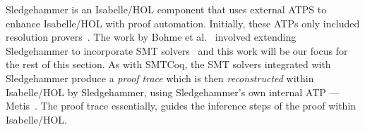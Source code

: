 \documentclass{article}
\begin{document}
	Sledgehammer is
	an Isabelle/HOL component that 
	uses external ATPS to enhance 
	Isabelle/HOL with proof 
	automation. Initially, these 
	ATPs only included resolution 
	provers~\cite{10.1007/978-3-642-39799-8_1}.
	The work by Bohme et 
	al.~\cite{bohme} involved 
	extending Sledgehammer to 
	incorporate SMT
	solvers~\cite{Barrett2018} and this 
	work will be our focus for the 
	rest of this section. As with 
	SMTCoq, the SMT solvers integrated
	with Sledgehammer produce a 
	\textit{proof trace} which is 
	then \textit{reconstructed} within
	Isabelle/HOL by Sledgehammer, 
	using Sledgehammer's own internal 
	ATP --- Metis~\cite{hurd2003d}. The 
	proof trace essentially, guides 
	the inference steps of the proof 
	within Isabelle/HOL.


\end{document}
